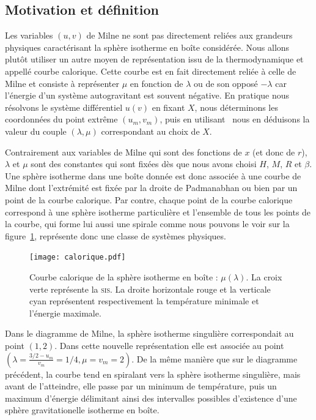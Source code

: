 \subsection{Motivation et définition}
	
	Les variables $(u,v)$ de Milne ne sont pas directement reliées aux grandeurs physiques caractérisant la sphère
	isotherme en boîte considérée. Nous allons plutôt utiliser un autre moyen de représentation issu de la
	thermodynamique et appellé courbe calorique. Cette courbe est en fait directement reliée à celle de Milne et
	consiste à représenter $\mu$ en fonction de $\lambda$ ou de son opposé $-\lambda$ car l'énergie d'un système
	autogravitant est souvent négative. En pratique nous résolvons le système différentiel $u(v)$ en fixant $X$,
	nous déterminons les coordonnées du point extrême $(u_m,v_m)$, puis en utilisant~ nous en déduisons la valeur
	du couple $(\lambda,\mu)$ correspondant au choix de $X$.
	
	Contrairement aux variables de Milne qui sont des fonctions de $x$ (et donc de $r$), $\lambda$ et $\mu$ sont des
	constantes qui sont fixées dès que nous avons choisi $H$, $M$, $R$ et $\beta$. Une sphère isotherme dans une boîte
	donnée est donc associée à une courbe de Milne dont l'extrémité est fixée par la droite de Padmanabhan ou bien
	par un point de la courbe calorique. Par contre, chaque point de la courbe calorique correspond à une sphère isotherme
	particulière et l'ensemble de tous les points de la courbe, qui forme lui aussi une spirale comme nous pouvons le
	voir sur la figure~\ref{Ener}, représente donc une classe de systèmes physiques.
	
	\begin{figure}[h!]
		\centering \texttt{[image: calorique.pdf]}
		\caption{Courbe calorique de la sphère isotherme en boîte : $\mu(\lambda)$. La croix verte représente la \textsc{sis}. La droite horizontale
		rouge et la verticale cyan représentent respectivement la température minimale et l'énergie maximale.}
		\label{Ener}
	\end{figure}

	Dans le diagramme de Milne, la sphère isotherme singulière correspondait au point $\left(1,2\right)$. Dans cette nouvelle représentation elle
	est associée au point $\left(\lambda = \frac{3/2 - u_m}{v_m} = 1/4, \mu = v_m = 2\right)$. De la même manière que sur le diagramme précédent,
	la courbe tend en spiralant vers la sphère isotherme singulière, mais avant de l'atteindre, elle passe par un minimum de température, puis un
	maximum d'énergie délimitant ainsi des intervalles possibles d'existence d'une sphère gravitationelle isotherme en boîte.

